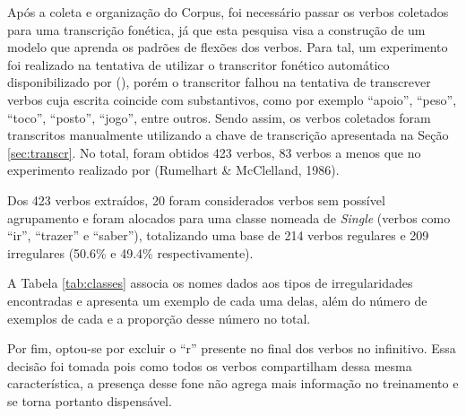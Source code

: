 Após a coleta e organização do Corpus, foi necessário passar os verbos coletados para uma transcrição fonética, já que esta pesquisa visa a construção de um modelo que aprenda os padrões de flexões dos verbos. Para tal, um experimento foi realizado na tentativa de utilizar o transcritor fonético automático disponibilizado por (\cite{guide:2016}), porém o transcritor falhou na tentativa de transcrever verbos cuja escrita coincide com substantivos, como por exemplo “apoio”, “peso”, “toco”, “posto”, “jogo”, entre outros. Sendo assim, os verbos coletados foram transcritos manualmente utilizando a chave de transcrição apresentada na Seção \ref{sec:transcr}. No total, foram obtidos 423 verbos, 83 verbos a menos que no experimento realizado por (Rumelhart \& McClelland, 1986)\cite{rumelhart:1986}.

Dos 423 verbos extraídos, 20 foram considerados verbos sem possível agrupamento e foram alocados para uma classe nomeada de \textit{Single} (verbos como “ir”, “trazer” e “saber”), totalizando uma base de 214 verbos regulares e 209 irregulares (50.6\% e 49.4\% respectivamente). 

A Tabela \ref{tab:classes} associa os nomes dados aos tipos de irregularidades encontradas e apresenta um exemplo de cada uma delas, além do número de exemplos de cada e a proporção desse número no total. 

Por fim, optou-se por excluir o “r” presente no final dos verbos no infinitivo. Essa decisão foi tomada pois como todos os verbos compartilham dessa mesma característica, a presença desse fone não agrega mais informação no treinamento e se torna portanto dispensável.

